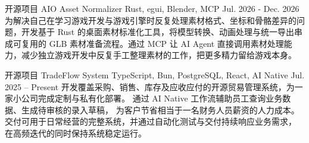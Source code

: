 \begin{cventries}
  \cventry
  {开源项目}
  {AIO Asset Normalizer}
  {Rust, egui, Blender, MCP}
  {Jul. 2026 - Dec. 2026}
  {
    为解决自己在学习游戏开发与游戏引擎时反复处理素材格式、坐标和骨骼差异的问题，开发基于 Rust 的桌面素材标准化工具，将模型转换、动画处理与统一导出串成可复用的 GLB 素材准备流程。通过 MCP 让 AI Agent 直接调用素材处理能力，减少独立游戏开发中反复手工整理素材的工作，把更多精力留给游戏本身。
  }

  \cventry
  {开源项目}
  {TradeFlow System}
  {TypeScript, Bun, PostgreSQL, React, AI Native}
  {Jul. 2025 -- Present}
  {
    开发覆盖采购、销售、库存及应收应付的开源贸易管理系统，为一家小公司完成定制与私有化部署。
    通过 AI Native 工作流辅助员工查询业务数据、生成待审核的录入草稿，
    为客户节省相当于一名财务人员薪资的人力成本。
    交付可用于日常经营的完整系统，并通过自动化测试与交付持续响应业务需求，
    在高频迭代的同时保持系统稳定运行。
  }
\end{cventries}
